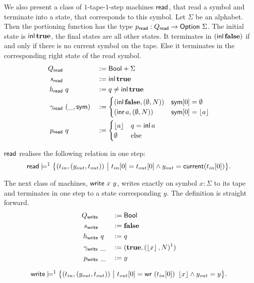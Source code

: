 \documentclass{psartcl}
\begin{document}
We also present a class of $1$-tape-$1$-step machines $\textsf{read}$, that read a symbol and terminate into a state, that corresponds to this symbol.
Let $\Sigma$ be an alphabet.  Then the portioning function has the type $p_{\textsf{read}} : Q_{\textsf{read}} \rightarrow \textsf{Option}~\Sigma $.
The initial state is $\operatorname{\textsf{inl}} \mathbf{true}$, the final states are all other states.  It terminates in $(\operatorname{\textsf{inl}} \mathbf{false})$ if and only if there is no current symbol
on the tape.  Else it terminates in the corresponding right state of the read symbol.
\begin{alignat*}{3}
  Q_     {\textsf{read}} &~  &&:= \textsf{Bool} + \Sigma \\
  s_     {\textsf{read}} &~  &&:= \operatorname{\textsf{inl}} \mathbf{true} \\
  h_     {\textsf{read}} &~q &&:= q \neq \operatorname{\textsf{inl}} \mathbf{true} \\
  \gamma_{\textsf{read}} &~(\_, \textsf{sym}) &&:=
  \begin{cases}
    (\operatorname{\textsf{inl}} \mathbf{false}, (\emptyset, N)) & \textsf{sym}[0] =\emptyset \\
    (\operatorname{\textsf{inr}} a,      (\emptyset, N)) & \textsf{sym}[0] =\left\lfloor {a}\right\rfloor
  \end{cases} \\
  p_     {\textsf{read}} &~q &&:=
  \begin{cases}
    \left\lfloor {a}\right\rfloor                   & q = \operatorname{\textsf{inl}} a \\
    \emptyset                     & \text{else}
  \end{cases}
\end{alignat*}

\begin{lemma}
  \label{lem:read-tm}
  $\textsf{read}$ realises the following relation in one step:
  $$\textsf{read} \models^1 \bigl\{ (t_{in}, (y_{out}, t_{out}))~\big|~t_{in}[0] = t_{out}[0] \land y_{out} = \textsf{current}(t_{in}[0]) \bigr \}.$$
\end{lemma}

The next class of machines, $\textsf{write}~x~y$, writes exactly on symbol $x:\Sigma$ to its tape and terminates in one step to a state corresponding $y$.
The definition is straight forward.
\begin{alignat*}{3}
  Q_     {\textsf{write}} &~  &&:= \textsf{Bool} \\
  s_     {\textsf{write}} &~  &&:= \mathbf{false} \\
  h_     {\textsf{write}} &~q &&:= q \\
  \gamma_{\textsf{write}} &~\_&&:= (\mathbf{true}, (\left\lfloor {x}\right\rfloor, N)^1) \\
  p_     {\textsf{write}} &~\_&&:= y
\end{alignat*}
\begin{lemma}
  \label{lem:write-tm}
  $$\textsf{write} \models^1 \bigl\{ (t_{in}, (y_{out}, t_{out}))~\big|~t_{out}[0] = \textsf{wr}~(t_{in}[0])~\left\lfloor {x}\right\rfloor \land y_{out} = y \bigr \}.$$
\end{lemma}
\end{document}
